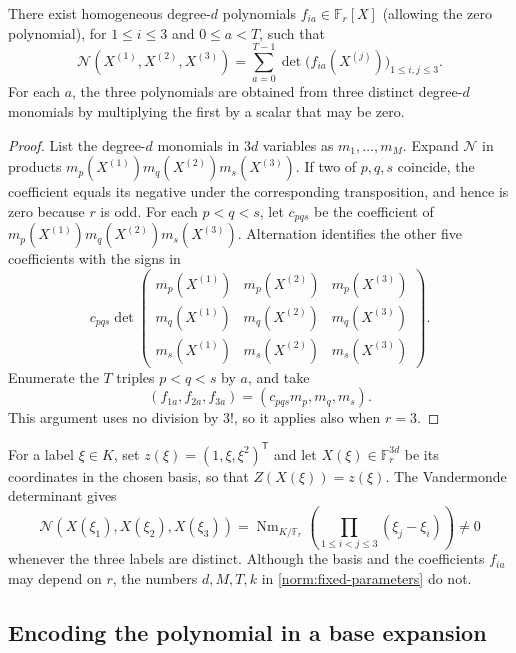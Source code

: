 \begin{lemma}\label{norm:decomposition}
There exist homogeneous degree-$d$ polynomials $f_{ia}\in\mathbb F_r[X]$
(allowing the zero polynomial), for
$1\le i\le3$ and $0\le a<T$, such that
\begin{equation}\label{norm:determinant-sum}
 \mathcal N(X^{(1)},X^{(2)},X^{(3)})
   =\sum_{a=0}^{T-1}
      \det\bigl(f_{ia}(X^{(j)})\bigr)_{1\le i,j\le3}.
\end{equation}
For each $a$, the three polynomials are obtained from three distinct
degree-$d$ monomials by multiplying the first by a scalar that may be zero.
\end{lemma}

\begin{proof}
List the degree-$d$ monomials in $3d$ variables as $m_1,\ldots,m_M$.
Expand $\mathcal N$ in products
$m_p(X^{(1)})m_q(X^{(2)})m_s(X^{(3)})$.
If two of $p,q,s$ coincide, the coefficient equals its negative under the
corresponding transposition, and hence is zero because $r$ is odd.
For each $p<q<s$, let $c_{pqs}$ be the coefficient of
$m_p(X^{(1)})m_q(X^{(2)})m_s(X^{(3)})$.
Alternation identifies the other five coefficients with the signs in
\[
 c_{pqs}\det
 \begin{pmatrix}
  m_p(X^{(1)})&m_p(X^{(2)})&m_p(X^{(3)})\\
  m_q(X^{(1)})&m_q(X^{(2)})&m_q(X^{(3)})\\
  m_s(X^{(1)})&m_s(X^{(2)})&m_s(X^{(3)})
 \end{pmatrix}.
\]
Enumerate the $T$ triples $p<q<s$ by $a$, and take
\[
 (f_{1a},f_{2a},f_{3a})=(c_{pqs}m_p,m_q,m_s).
\]
This argument uses no division by $3!$, so it applies also when $r=3$.
\end{proof}

For a label $\xi\in K$, set $z(\xi)=(1,\xi,\xi^2)^{\mathsf T}$ and
let $X(\xi)\in\mathbb F_r^{3d}$ be its coordinates in the chosen basis,
so that $Z(X(\xi))=z(\xi)$.
The Vandermonde determinant gives
\begin{equation}\label{norm:distinct-labels}
 \mathcal N(X(\xi_1),X(\xi_2),X(\xi_3))
  =\operatorname{Nm}_{K/\mathbb F_r}
        \left(\prod_{1\le i<j\le3}(\xi_j-\xi_i)\right)\ne0
\end{equation}
whenever the three labels are distinct.
Although the basis and the coefficients $f_{ia}$ may depend on $r$, the
numbers $d,M,T,k$ in \eqref{norm:fixed-parameters} do not.

\subsection{Encoding the polynomial in a base expansion}

